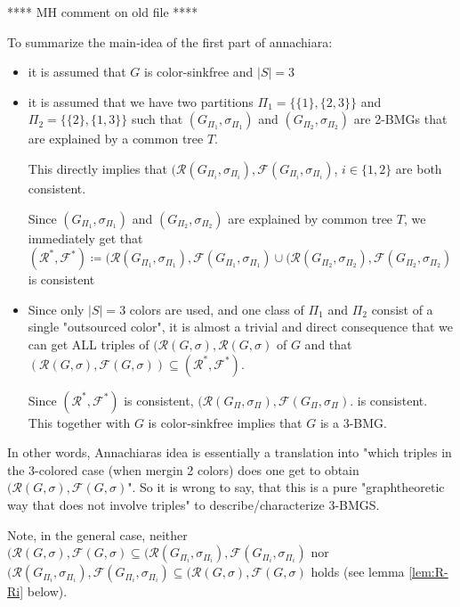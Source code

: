 \documentclass[final,3p,times]{elsarticle}
\newcommand{\TODO}[1]{\begingroup\color{red}#1\endgroup}
\begin{document}
\TODO{ \begin{center}**** MH comment on old file **** \end{center} 
 To summarize the main-idea of the first part of annachiara: 
 \begin{itemize}[nolistsep, noitemsep]
 	\item it is assumed that $G$ is color-sinkfree and $|S|=3$
 	\item it is assumed that we have two partitions $\Pi_1 = \{\{1\},\{2,3\}\}$ and $\Pi_2=
		 \{\{2\},\{1,3\}\}$ such that 		 
		 $(G_{\Pi_1},\sigma_{\Pi_1})$ and $(G_{\Pi_2},\sigma_{\Pi_2})$ are 2-BMGs that
		 are explained by a common tree $T$. \smallskip
		 
		 This directly implies that
		 $(\mathscr{R}(G_{\Pi_i},\sigma_{\Pi_i}),\mathscr{F}(G_{\Pi_i},\sigma_{\Pi_i})$,
 		$i\in \{1,2\}$ are both consistent.		 \smallskip
 		
 		Since $(G_{\Pi_1},\sigma_{\Pi_1})$ and $(G_{\Pi_2},\sigma_{\Pi_2})$ are explained by common tree $T$, 
 		we immediately get that 
 		$(\mathscr{R}^*, \mathscr{F}^*) \coloneqq
 		  (\mathscr{R}(G_{\Pi_1},\sigma_{\Pi_1}),\mathscr{F}(G_{\Pi_1},\sigma_{\Pi_1})
 		  \cup (\mathscr{R}(G_{\Pi_2},\sigma_{\Pi_2}),\mathscr{F}(G_{\Pi_2},\sigma_{\Pi_2})$
 		  is consistent	
 	\item Since only $|S|=3$ colors are used, and one class of $\Pi_1$ and
 	      $\Pi_2$ consist of a single "outsourced color", it is almost a trivial
 	      and direct consequence that we can get ALL triples of
 	      $(\mathscr{R}(G,\sigma),\mathscr{R}(G,\sigma)$ of $G$ and that
 	      $(\mathscr{R}(G,\sigma),\mathscr{F}(G,\sigma)) \subseteq
 	      (\mathscr{R}^*, \mathscr{F}^*)$. 
 	      
  	      Since $(\mathscr{R}^*, \mathscr{F}^*)$ is consistent, 
 	      $(\mathscr{R}(G_{\Pi},\sigma_{\Pi}),\mathscr{F}(G_{\Pi},\sigma_{\Pi})$.
 	      is consistent. This together with $G$ is color-sinkfree implies that
 	      $G$ is a 3-BMG.  
  	  
 \end{itemize}
 
 \smallskip
 \noindent
  In other words, Annachiaras idea is essentially  a translation
 into "which triples in the 3-colored case (when mergin 2 colors) 
 does one get to obtain $(\mathscr{R}(G,\sigma),\mathscr{F}(G,\sigma)$". 
 So it is wrong to say, that this is a pure "graphtheoretic way
 that does not involve triples"
 to describe/characterize 3-BMGS. \smallskip
 
 Note, in the general case, neither $(\mathscr{R}(G,\sigma),\mathscr{F}(G,\sigma)
 \subseteq (\mathscr{R}(G_{\Pi_i},\sigma_{\Pi_i}),\mathscr{F}(G_{\Pi_i},\sigma_{\Pi_i})$
 nor $ (\mathscr{R}(G_{\Pi_i},\sigma_{\Pi_i}),\mathscr{F}(G_{\Pi_i},\sigma_{\Pi_i})
 \subseteq (\mathscr{R}(G,\sigma),\mathscr{F}(G,\sigma)$
 holds (see lemma \ref{lem:R-Ri} below).\smallskip 
 
}
\end{document}
